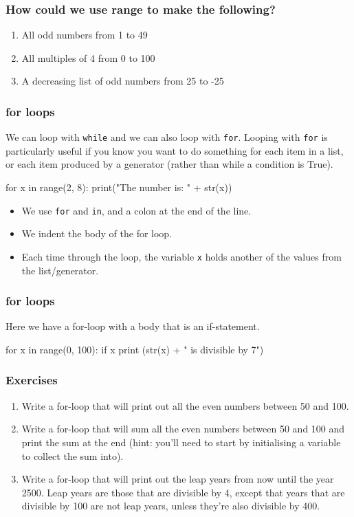 \documentclass{beamer}
\begin{document}
\begin{frame}
\frametitle{How could we use range to make the following?}
\begin{enumerate}
\item All odd numbers from 1 to 49
\item All multiples of 4 from 0 to 100
\item A decreasing list of odd numbers from 25 to -25
\end{enumerate}
\end{frame}

\begin{frame}[fragile]
\frametitle{for loops}
We can loop with \texttt{while} and we can also loop with \texttt{for}.
Looping with \texttt{for} is particularly useful if you know you
want to do something for each item in a list, or each item produced by
a generator (rather than while a condition is True).
\begin{code}
for x in range(2, 8):
   print("The number is: " + str(x))
\end{code}
\begin{itemize}
\item We use \texttt{for} and \texttt{in}, and a colon at the end of the line.
\item We indent the body of the for loop.
\item Each time through the loop, the variable \texttt{x} holds another of the values from
  the list/generator.
\end{itemize}
\end{frame}


\begin{frame}[fragile]
\frametitle{for loops}
Here we have a for-loop with a body that is an if-statement.
\bigskip
\begin{code}
for x in range(0, 100):
   if x %
      print (str(x) + " is divisible by 7")
\end{code}
\end{frame}

\begin{frame}
\frametitle{Exercises}
\begin{enumerate}
\item Write a for-loop that will print out all the even numbers
between 50 and 100.
\item Write a for-loop that will sum all the even numbers
between 50 and 100 and print the sum at the end (hint:
you'll need to start by initialising a variable to collect the
sum into).
\item Write a for-loop that will print out the leap years from
now until the year 2500. Leap years are those that are
divisible by 4, except that years that are divisible by 100
are not leap years, unless they're also divisible by 400.
\end{enumerate}
\end{frame}
\end{document}
